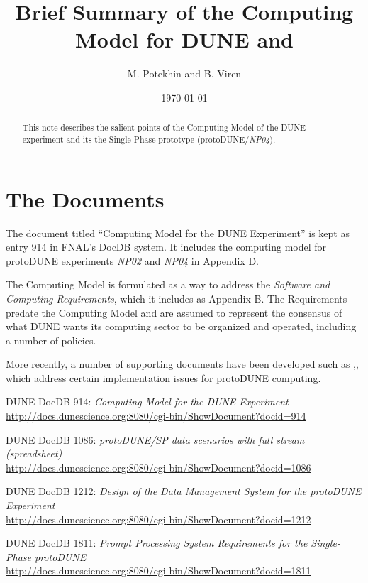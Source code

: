 \documentclass[pdftex,12pt,letter]{article}
\title{Brief Summary of the Computing Model for DUNE and \pd}
\date{\today}
\author{M. Potekhin and B. Viren}
\newcommand{\pd}{protoDUNE\xspace}
\newcommand{\expname}{\textit{NP04}\xspace}
\newcommand{\eXpname}{\textit{NP02}\xspace}
\begin{document}
\maketitle

\begin{abstract}
\noindent  This note describes  the salient points of the Computing Model of the DUNE experiment and its the Single-Phase prototype (\pd/\expname).
\end{abstract}

\section{The Documents}

The document titled ``Computing Model for the DUNE Experiment'' is kept as entry 914 in FNAL's DocDB system.
It includes the computing model for \pd experiments \eXpname and \expname in Appendix D.

The Computing Model is formulated as a way to address the \textit{Software and Computing Requirements},
which it includes as Appendix B. The Requirements predate the Computing Model and are assumed to represent
the consensus of what DUNE wants its computing sector to be organized and operated, including
a number of policies.

More recently, a number of supporting documents have been developed such as \cite{docdb1086},\cite{docdb1212},\cite{docdb1811}
which address certain implementation issues for \pd computing.



\begin{thebibliography}{1}
{DUNE DocDB 914: \textit{ Computing Model for the DUNE Experiment}}\\
\url{http://docs.dunescience.org:8080/cgi-bin/ShowDocument?docid=914}

{DUNE DocDB 1086: \textit{ protoDUNE/SP data scenarios with full stream (spreadsheet)}}\\
\url{http://docs.dunescience.org:8080/cgi-bin/ShowDocument?docid=1086}


{DUNE DocDB 1212: \textit{Design of the Data Management System for the protoDUNE Experiment}}\\
\url{http://docs.dunescience.org:8080/cgi-bin/ShowDocument?docid=1212}


{DUNE DocDB 1811: \textit{Prompt Processing System Requirements for the Single-Phase protoDUNE}}\\
\url{http://docs.dunescience.org:8080/cgi-bin/ShowDocument?docid=1811}
\end{thebibliography}
\end{document}
